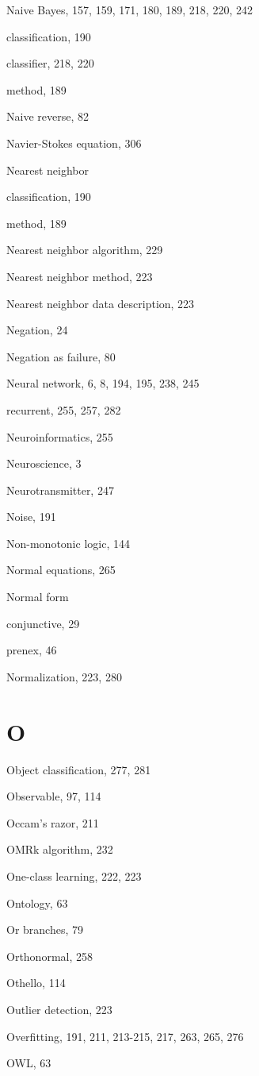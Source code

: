 \documentclass[10pt]{book}
\begin{document}
\begin{center}
Naive Bayes, 157, 159, 171, 180, 189, 218, 220, 242

classification, 190

classifier, 218, 220

method, 189

Naive reverse, 82

Navier-Stokes equation, 306

Nearest neighbor

classification, 190

method, 189

Nearest neighbor algorithm, 229

Nearest neighbor method, 223

Nearest neighbor data description, 223

Negation, 24

Negation as failure, 80

Neural network, 6, 8, 194, 195, 238, 245

recurrent, 255, 257, 282

Neuroinformatics, 255

Neuroscience, 3

Neurotransmitter, 247

Noise, 191

Non-monotonic logic, 144

Normal equations, 265

Normal form

conjunctive, 29

prenex, 46

Normalization, 223, 280

\section{O}

Object classification, 277, 281

Observable, 97, 114

Occam's razor, 211

OMRk algorithm, 232

One-class learning, 222, 223

Ontology, 63

Or branches, 79

Orthonormal, 258

Othello, 114

Outlier detection, 223

Overfitting, 191, 211, 213-215, 217, 263, 265, 276

OWL, 63


\end{center}
\end{document}
